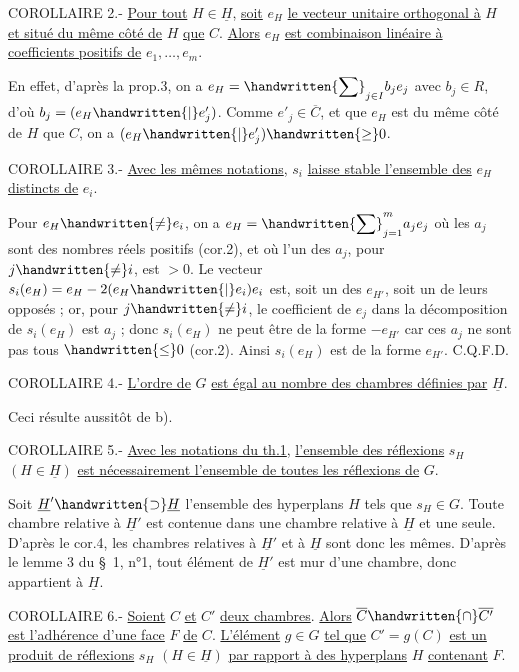 COROLLAIRE 2.- \uline{Pour tout} $H\in\underline{H}$, \uline{soit} $e_H$ \uline{le vecteur unitaire orthogonal à} $H$ \uline{et situé du même côté de} $H$ \uline{que} $C$. \uline{Alors} $e_H$ \uline{est combinaison linéaire à coefficients positifs de} $e_1,\ldots,e_m$.

En effet, d'après la prop.3, on a $\displaystyle e_H=\handwritten{\sum}_{j\in I}b_j e_j$ avec $b_j\in R$, d'où $b_j=(e_H\handwritten{|}e'_j)$. Comme $e'_j\in\overline{C}$, et que $e_H$ est du même côté de $H$ que $C$, on a $(e_H\handwritten{|}e'_j)\handwritten{\geq}0$.

COROLLAIRE 3.- \uline{Avec les mêmes notations}, $s_i$ \uline{laisse stable l'ensemble des} $e_H$ \uline{distincts de} $e_i$.

Pour $e_H\handwritten{\ne}e_i$, on a $\displaystyle e_H=\handwritten{\sum}_{j=1}^m a_j e_j$ où les $a_j$ sont des nombres réels positifs (cor.2), et où l'un des $a_j$, pour $j\handwritten{\ne}i$, est $>0$. Le vecteur $s_i(e_H)=e_H-2(e_H\handwritten{|}e_i)e_i$ est, soit un des $e_{H'}$, soit un de leurs opposés ; or, pour $j\handwritten{\ne}i$, le coefficient de $e_j$ dans la décomposition de $s_i(e_H)$ est $a_j$ ; donc $s_i(e_H)$ ne peut être de la forme $-e_{H'}$ car ces $a_j$ ne sont pas tous $\handwritten{\leq}0$ (cor.2). Ainsi $s_i(e_H)$ est de la forme $e_{H'}$. C.Q.F.D.

COROLLAIRE 4.- \uline{L'ordre de} $G$ \uline{est égal au nombre des chambres définies par} $\underline{H}$.

Ceci résulte aussitôt de b).

COROLLAIRE 5.- \uline{Avec les notations du th.1}, \uline{l'ensemble des réflexions} $s_H$ $(H\in\underline{H})$ \uline{est nécessairement l'ensemble de toutes les réflexions de} $G$.

Soit $\underline{H}'\handwritten{\supset}\underline{H}$ l'ensemble des hyperplans $H$ tels que $s_H\in G$. Toute chambre relative à $\underline{H}'$ est contenue dans une chambre relative à $\underline{H}$ et une seule. D'après le cor.4, les chambres relatives à $\underline{H}'$ et à $\underline{H}$ sont donc les mêmes. D'après le lemme 3 du \S\ 1, n°1, tout élément de $\underline{H}'$ est mur d'une chambre, donc appartient à $\underline{H}$.

COROLLAIRE 6.- \uline{Soient} $C$ \uline{et} $C'$ \uline{deux chambres}. \uline{Alors} $\overline{C}\handwritten{\cap}\overline{C'}$ \uline{est l'adhérence d'une face} $F$ \uline{de} $C$. \uline{L'élément} $g\in G$ \uline{tel que} $C'=g(C)$ \uline{est un produit de réflexions} $s_H$ $(H\in\underline{H})$ \uline{par rapport à des hyperplans} $H$ \uline{contenant} $F$.

